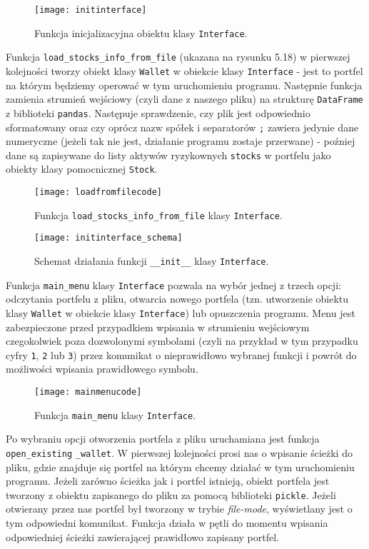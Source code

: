 \documentclass[magister]{dyplom}
\def\code#1{\texttt{#1}}
\begin{document}
\begin{figure}[ht]
	\centering
	\texttt{[image: initinterface]}
	\caption{Funkcja inicjalizacyjna obiektu klasy \code{Interface}.}
\end{figure}
\newpage
Funkcja \code{load\_stocks\_info\_from\_file} (ukazana na rysunku 5.18) w pierwszej kolejności tworzy obiekt klasy \code{Wallet} w obiekcie klasy \code{Interface} - jest to portfel na którym będziemy operować w tym uruchomieniu programu. Następnie funkcja zamienia strumień wejściowy (czyli dane z naszego pliku) na strukturę \code{DataFrame} z biblioteki \code{pandas}. Następuje sprawdzenie, czy plik jest odpowiednio sformatowany oraz czy oprócz nazw spółek i separatorów \code{;} zawiera jedynie dane numeryczne (jeżeli tak nie jest, działanie programu zostaje przerwane) - poźniej dane są zapisywane do listy aktywów ryzykownych \code{stocks} w portfelu jako obiekty klasy pomocnicznej \code{Stock}.

\begin{figure}[ht]
	\centering
	\texttt{[image: loadfromfilecode]}
	\caption{Funkcja \code{load\_stocks\_info\_from\_file} klasy \code{Interface}.}
\end{figure}

\begin{figure}[ht]
	\centering
	\texttt{[image: initinterface\_schema]}
	\caption{Schemat działania funkcji \code{\_\_init\_\_} klasy \code{Interface}.}
\end{figure}
\newpage
Funkcja \code{main\_menu} klasy \code{Interface} pozwala na wybór jednej z trzech opcji: odczytania portfelu z pliku, otwarcia nowego portfela (tzn. utworzenie obiektu klasy \code{Wallet} w obiekcie klasy \code{Interface}) lub opuszczenia programu. Menu jest zabezpieczone przed przypadkiem wpisania w strumieniu wejściowym czegokolwiek poza dozwolonymi symbolami (czyli na przykład w tym przypadku cyfry \code{1}, \code{2} lub \code{3}) przez komunikat o nieprawidłowo wybranej funkcji i powrót do możliwości wpisania prawidłowego symbolu.

\begin{figure}[ht!]
	\centering
	\texttt{[image: mainmenucode]}
	\caption{Funkcja \code{main\_menu} klasy \code{Interface}.}
\end{figure}
\newpage
Po wybraniu opcji otworzenia portfela z pliku uruchamiana jest funkcja \code{open\_existing} \code{\_wallet}. W pierwszej kolejności prosi nas o wpisanie ścieżki do pliku, gdzie znajduje się portfel na którym chcemy działać w tym uruchomieniu programu. Jeżeli zarówno ścieżka jak i portfel istnieją, obiekt portfela jest tworzony z obiektu zapisanego do pliku za pomocą biblioteki \code{pickle}. Jeżeli otwierany przez nas portfel był tworzony w trybie \textit{file-mode}, wyświetlany jest o tym odpowiedni komunikat. Funkcja działa w pętli do momentu wpisania odpowiedniej ścieżki zawierającej prawidłowo zapisany portfel.
\end{document}
